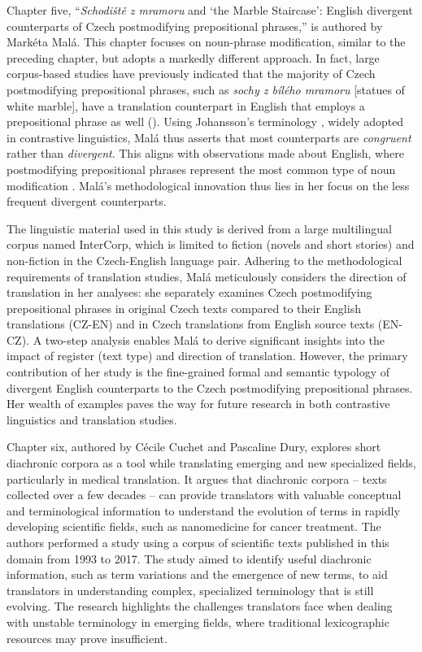 \documentclass[output=paper]{langscibook}
\begin{document}
Chapter five, “\textit{Schodiště z mramoru} and ‘the Marble Staircase’: English divergent counterparts of Czech postmodifying prepositional phrases,” is authored by Markéta Malá. This chapter focuses on noun-phrase modification, similar to the preceding chapter, but adopts a markedly different approach. In fact, large corpus-based studies have previously indicated that the majority of Czech postmodifying prepositional phrases, such as \textit{sochy z bílého mramoru} [statues of white marble], have a translation counterpart in English that employs a prepositional phrase as well (\citealt{KlégrMalá2009}). Using Johansson’s terminology \citep{Johansson2007}, widely adopted in contrastive linguistics, Malá thus asserts that most counterparts are \textit{congruent} rather than \textit{divergent}. This aligns with observations made about English, where postmodifying prepositional phrases represent the most common type of noun modification \citep{BiberEtAl2021}. Malá’s methodological innovation thus lies in her focus on the less frequent divergent counterparts.

The linguistic material used in this study is derived from a large multilingual corpus named InterCorp, which is limited to fiction (novels and short stories) and non-fiction in the Czech-English language pair. Adhering to the methodological requirements of translation studies, Malá meticulously considers the direction of translation in her analyses: she separately examines Czech postmodifying prepositional phrases in original Czech texts compared to their English translations (CZ-EN) and in Czech translations from English source texts (EN-CZ). A two-step analysis enables Malá to derive significant insights into the impact of register (text type) and direction of translation. However, the primary contribution of her study is the fine-grained formal and semantic typology of divergent English counterparts to the Czech postmodifying prepositional phrases. Her wealth of examples paves the way for future research in both contrastive linguistics and translation studies.

Chapter six, authored by Cécile Cuchet and Pascaline Dury, explores short diachronic corpora as a tool while translating emerging and new specialized fields, particularly in medical translation. It argues that diachronic corpora – texts collected over a few decades – can provide translators with valuable conceptual and terminological information to understand the evolution of terms in rapidly developing scientific fields, such as nanomedicine for cancer treatment. The authors performed a study using a corpus of scientific texts published in this domain from 1993 to 2017. The study aimed to identify useful diachronic information, such as term variations and the emergence of new terms, to aid translators in understanding complex, specialized terminology that is still evolving. The research highlights the challenges translators face when dealing with unstable terminology in emerging fields, where traditional lexicographic resources may prove insufficient.
\end{document}

